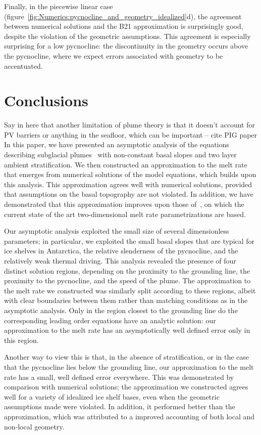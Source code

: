 \documentclass[openacc]{rsproca_new}%
\newcommand{\red}[1]{{\color{red} #1}}
\begin{document}
Finally, in the piecewise linear case (figure~\ref{fig:Numerics:pycnocline_and_geometry_idealized}d), the agreement between numerical solutions and the B21 approximation is surprisingly good, despite the violation of the geometric assumptions. This agreement is especially surprising for a low pycnocline: the discontinuity in the geometry occurs above the pycnocline, where we expect errors associated with geometry to be accentuated. 

\section{Conclusions}\label{S:Discussion}
\red{Say in here that another limitation of plume theory is that it doesn't account for PV barriers or anything in the seafloor, which can be important -- cite PIG paper}
In this paper, we have presented an asymptotic analysis of the equations describing subglacial plumes~\cite{Jenkins1991JGeophysResOceans, Jenkins2011JPhysOcean} with non-constant basal slopes and two layer ambient stratification. We then constructed an approximation to the melt rate that emerges from numerical solutions of the model equations, which builds upon this analysis. This approximation agrees well with numerical solutions, provided that assumptions on the basal topography are not violated. In addition, we have demonstrated that this approximation improves upon those of~\citet{Lazeroms2019JPhysOcean}, on which the current state of the art two-dimensional melt rate parametrizations are based.

Our asymptotic analysis exploited the small size of several dimensionless parameters; in particular, we exploited the small  basal slopes that are typical for ice shelves in Antarctica, the relative slenderness of the pycnocline, and the relatively weak thermal driving. This analysis revealed the presence of four distinct solution regions, depending on the proximity to the grounding line, the proximity to the pycnocline, and the speed of the plume. The approximation to the melt rate we constructed was similarly split according to these regions, albeit with clear boundaries between them rather than matching conditions as in the asymptotic analysis. Only in the region closest to the grounding line do the corresponding leading order equations have an analytic solution: our approximation to the melt rate has an asymptotically well defined error only in this region. 

Another way to view this is that, in the absence of stratification, or in the case that the pycnocline lies below the grounding line, our approximation to the melt rate has a small, well defined error everywhere.  This was demonstrated by comparison with numerical solutions; the approximation we constructed agrees well for a variety of idealized ice shelf bases, even when the geometric assumptions made were violated. In addition, it performed better than the ~\citet{Lazeroms2019JPhysOcean} approximation, which was attributed to a improved accounting of both local and non-local geometry.
\end{document}
